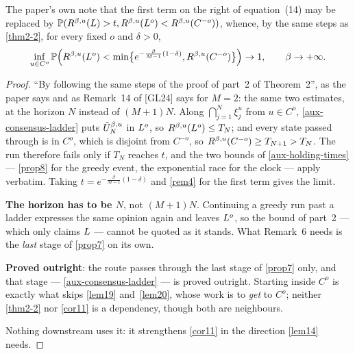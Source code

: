 \begin{remark}
  \label{rem6}
  \leanok
  The paper's own note that the first term on the right of equation~(14) may be
  replaced by $\mathbb{P}(R^{\beta,u}(L) > t, R^{\beta,u}(L^o) <
  R^{\beta,u}(C^{-o}))$, whence, by the same steps as \ref{thm2-2}, for
  every fixed $o$ and $\delta > 0$,
  \[
    \inf_{u \in C^o} \mathbb{P}\Bigl(
      R^{\beta,u}(L^o) < \min\bigl\{e^{-\frac{\beta}{M-1}(1-\delta)},
        R^{\beta,u}(C^{-o})\bigr\}\Bigr) \to 1,
    \qquad \beta \to +\infty .
  \]
\end{remark}
\begin{proof}
  \leanok
  ``By following the same steps of the proof of part~2 of Theorem~2'', as the
  paper says and as Remark~14 of [GL24] says for $M = 2$: the same two
  estimates, at the horizon $N$ instead of $(M+1)N$.  Along
  $\bigcap_{j=1}^{N} \xi_j^u$ from $u \in C^o$, \ref{aux-consensus-ladder} puts
  $\tilde{U}^{\beta,u}_N$ in $L^o$, so $R^{\beta,u}(L^o) \le T_N$; and every
  state passed through is in $C^o$, which is disjoint from $C^{-o}$, so
  $R^{\beta,u}(C^{-o}) \ge T_{N+1} > T_N$.  The run therefore fails only if
  $T_N$ reaches $t$, and the two bounds of \ref{aux-holding-times} ---
  \ref{prop8} for the greedy event, the exponential race for the clock ---
  apply verbatim.  Taking $t = e^{-\frac{\beta}{M-1}(1-\delta)}$ and
  \ref{rem4} for the first term gives the limit.

  \textbf{The horizon has to be $N$}, not $(M+1)N$.  Continuing a greedy run
  past a ladder expresses the same opinion again and leaves $L^o$, so the
  bound of part~2 --- which only claims $L$ --- cannot be quoted as it
  stands.  What Remark~6 needs is the \emph{last} stage of \ref{prop7} on its
  own.

  \textbf{Proved outright}: the route passes through the last
  stage of \ref{prop7} only, and that stage --- \ref{aux-consensus-ladder} ---
  is proved outright.  Starting inside $C^o$ is exactly what skips
  \ref{lem19} and~\ref{lem20}, whose work is to \emph{get} to $C^o$; neither
  \ref{thm2-2} nor \ref{cor11} is a dependency, though both are neighbours.

  Nothing downstream uses it: it strengthens \ref{cor11} in the direction
  \ref{lem14} needs.
\end{proof}


